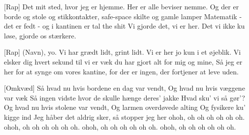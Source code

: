 \documentclass[a4paper,11pt]{article}
\begin{document}
\begin{song}
[Rap] Det mit sted, hvor jeg er hjemme. Her er alle beviser nemme.
Og der er borde og stole og stikkontakter, safe-space skilte og
gamle lamper
Matematik - det er fedt - og i kantinen er tal the shit
Vi gjorde det, vi er her. Det vi ikke ku løse, gjorde os stærkere.

[Rap] (Navn), yo. Vi har grædt lidt, grint lidt. Vi er her jo kun i et
øjeblik.
Vi elsker dig hvert sekund til vi er væk
du har gjort alt for mig og mine,
Så jeg er her for at synge om vores kantine,
for der er ingen, der fortjener at leve uden.

[Omkvæd] Så hvad nu hvis bordene en dag var vendt,
Og hvad nu hvis væggene var væk
Så ingen vidste hvor de skulle hænge deres’ jakke
Hvad sku’ vi så gør’?
Og hvad nu hvis stolene var vendt,
Og larmen overdøvede alting
Og fysikere ku’ kigge ind
Jeg håber det aldrig sker, så stopper jeg her
ohoh, oh oh oh oh oh oh. ohoh, oh oh oh oh oh oh.
ohoh, oh oh oh oh oh oh. ohoh, oh oh oh oh oh oh.

    
\end{song}
\end{document}
